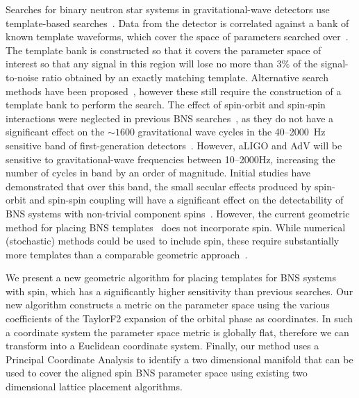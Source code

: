Searches
for binary neutron star systems in gravitational-wave detectors use
template-based searches~\cite{Allen:2005fk}. Data from the detector is
correlated against a bank of known template waveforms, which cover the space
of parameters searched over~\cite{OwenSathyaprakash98}. The template bank is
constructed so that it covers the parameter space of interest
so that any signal in this region will lose no more
than $3\%$ of the signal-to-noise ratio obtained by an exactly matching
template. Alternative search methods have been proposed~\cite{Marion:2004,Cannon:2010qh},
however these still require the construction of a template bank to perform the
search.
The effect of spin-orbit and spin-spin interactions were neglected in previous
BNS searches~\cite{Abadie:2011nz}, as they do not have a significant effect on
the $\sim 1600$ gravitational wave cycles in the 40--2000~Hz sensitive band of
first-generation detectors~\cite{Apostolatos:1996rf}. However, aLIGO and AdV
will be sensitive to gravitational-wave frequencies between 10--2000Hz,
increasing the number of cycles in band by an order of magnitude.
Initial studies have demonstrated that over this band, the small secular
effects produced by spin-orbit and spin-spin coupling will have a significant
effect on the detectability of BNS systems with non-trivial component
spins~\cite{Ajith:2011ec}. However, the current geometric method for placing
BNS templates~\cite{Bank06} does not incorporate spin. While numerical
(stochastic) methods could be used to include spin, these require
substantially more templates than a comparable geometric
approach~\cite{Harry:2009ea}. 

We present a new geometric algorithm for placing templates for BNS systems
with spin, which has a significantly higher sensitivity than previous
searches.  Our new algorithm constructs a metric on the parameter space using
the various coefficients of the TaylorF2 expansion of the orbital phase as
coordinates. In such a coordinate system the parameter space metric is
globally flat, therefore we can transform into a Euclidean coordinate system.
Finally, our method uses a Principal Coordinate Analysis to identify a two
dimensional manifold that can be used to cover the aligned spin BNS parameter
space using existing two dimensional lattice placement algorithms.

